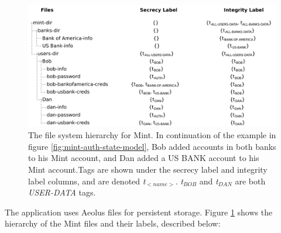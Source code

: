 \begin{figure}[h]
\centering
\includegraphics[width=\textwidth,height=\textheight,keepaspectratio]{figures/mint-filesystem}
\caption{The file system hierarchy for Mint. In continuation of the example in figure \ref{fig:mint-auth-state-model}, Bob added accounts in both banks to his Mint account, and Dan added a US BANK account to his Mint account.Tags are shown under the secrecy label and integrity label columns, and are denoted \emph{t$_{<name>}$}. \emph{t$_{BOB}$} and \emph{t$_{DAN}$} are both \emph{USER-DATA} tags.}
\label{fig:mint-fs}
\end{figure}

The application uses Aeolus files for persistent storage. Figure \ref{fig:mint-fs} shows the hierarchy of the Mint files and their labels, described below:

